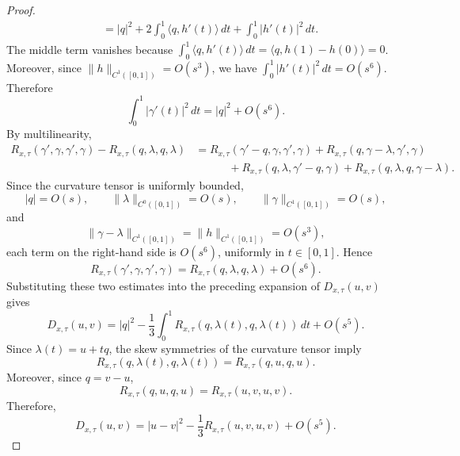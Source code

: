 \documentclass[11pt]{article}
\theoremstyle{remark}
\numberwithin{equation}{section}
\begin{document}
\begin{proof}
\[\begin{aligned}
&=
|q|^2
+
2\int_0^1\langle q,h'(t)\rangle\,dt
+
\int_0^1|h'(t)|^2\,dt.
\end{aligned}
\]
The middle term vanishes because
$\int_0^1\langle q,h'(t)\rangle\,dt
=
\langle q,h(1)-h(0)\rangle
=
0$.
Moreover, since $\|h\|_{C^1([0,1])}=O(s^3)$, we have
$\int_0^1|h'(t)|^2\,dt=O(s^6)$.
Therefore
\[
\int_0^1|\gamma'(t)|^2\,dt
=
|q|^2+O(s^6).
\]
By multilinearity,
\[
\begin{aligned}
R_{x,\tau}(\gamma',\gamma,\gamma',\gamma)
-R_{x,\tau}(q,\lambda,q,\lambda)
&=
R_{x,\tau}(\gamma'-q,\gamma,\gamma',\gamma)
+
R_{x,\tau}(q,\gamma-\lambda,\gamma',\gamma)\\
&\quad\qquad+
R_{x,\tau}(q,\lambda,\gamma'-q,\gamma)
+
R_{x,\tau}(q,\lambda,q,\gamma-\lambda).
\end{aligned}
\]
Since the curvature tensor is uniformly bounded,
\[
|q|=O(s),\qquad
\|\lambda\|_{C^0([0,1])}=O(s),\qquad
\|\gamma\|_{C^1([0,1])}=O(s),
\]
and
\[
\|\gamma-\lambda\|_{C^1([0,1])}
=
\|h\|_{C^1([0,1])}
=
O(s^3),
\]
each term on the right-hand side is $O(s^6)$, uniformly in
$t\in[0,1]$.  Hence
\[
R_{x,\tau}(\gamma',\gamma,\gamma',\gamma)
=
R_{x,\tau}(q,\lambda,q,\lambda)+O(s^6).
\]
Substituting these two estimates into the preceding expansion of
$D_{x,\tau}(u,v)$ gives
\[
D_{x,\tau}(u,v)
=
|q|^2
-\frac13\int_0^1
R_{x,\tau}(q,\lambda(t),q,\lambda(t))\,dt
+O(s^5).
\]
Since $\lambda(t)=u+tq$, the skew symmetries of the curvature tensor imply
\[
R_{x,\tau}(q,\lambda(t),q,\lambda(t))
=
R_{x,\tau}(q,u,q,u).
\]
Moreover, since $q=v-u$,
\[
R_{x,\tau}(q,u,q,u)
=
R_{x,\tau}(u,v,u,v).
\]
Therefore,
\[
D_{x,\tau}(u,v)
=
|u-v|^2
-\frac13R_{x,\tau}(u,v,u,v)
+O(s^5).
\]


\end{proof}
\end{document}

